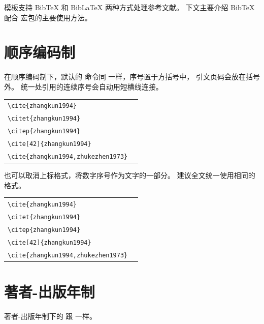模板支持 BibTeX 和 BibLaTeX 两种方式处理参考文献。
下文主要介绍 BibTeX 配合  宏包的主要使用方法。


\section{顺序编码制}

在顺序编码制下，默认的  命令同  一样，序号置于方括号中，
引文页码会放在括号外。
统一处引用的连续序号会自动用短横线连接。

\begin{tabular}{l@{\quad$\Rightarrow$\quad}l}
  \verb|\cite{zhangkun1994}|               & \cite{zhangkun1994}               \\
  \verb|\citet{zhangkun1994}|              & \citet{zhangkun1994}              \\
  \verb|\citep{zhangkun1994}|              & \citep{zhangkun1994}              \\
  \verb|\cite[42]{zhangkun1994}|           & \cite[42]{zhangkun1994}           \\
  \verb|\cite{zhangkun1994,zhukezhen1973}| & \cite{zhangkun1994,zhukezhen1973} \\
\end{tabular}


也可以取消上标格式，将数字序号作为文字的一部分。
建议全文统一使用相同的格式。

\begin{tabular}{l@{\quad$\Rightarrow$\quad}l}
  \verb|\cite{zhangkun1994}|               & \cite{zhangkun1994}               \\
  \verb|\citet{zhangkun1994}|              & \citet{zhangkun1994}              \\
  \verb|\citep{zhangkun1994}|              & \citep{zhangkun1994}              \\
  \verb|\cite[42]{zhangkun1994}|           & \cite[42]{zhangkun1994}           \\
  \verb|\cite{zhangkun1994,zhukezhen1973}| & \cite{zhangkun1994,zhukezhen1973} \\
\end{tabular}



\section{著者-出版年制}

著者-出版年制下的  跟  一样。

